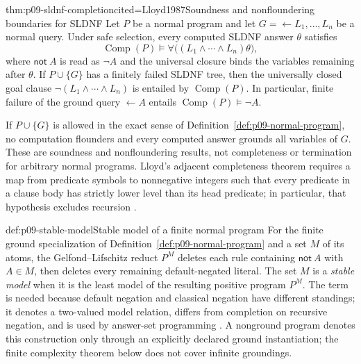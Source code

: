 \begin{hbtheorem}{thm:p09-sldnf-completion}{cited=Lloyd1987}{Soundness and nonfloundering boundaries for SLDNF}
Let \(P\) be a normal program and let
\(G=\leftarrow L_1,\ldots,L_n\) be a normal query.  Under safe selection, every
computed SLDNF answer \(\theta\) satisfies
\[
 \operatorname{Comp}(P)\models
 \forall\bigl((L_1\land\cdots\land L_n)\theta\bigr),
\]
where \(\mathsf{not}\ A\) is read as \(\neg A\) and the universal closure binds
the variables remaining after \(\theta\).  If \(P\cup\{G\}\) has a finitely
failed SLDNF tree, then the universally closed goal clause
\(\neg(L_1\land\cdots\land L_n)\) is entailed by
\(\operatorname{Comp}(P)\).  In particular, finite failure of the ground query
\(\leftarrow A\) entails \(\operatorname{Comp}(P)\models\neg A\).

If \(P\cup\{G\}\) is allowed in the exact sense of
Definition~\ref{def:p09-normal-program}, no computation flounders and every
computed answer grounds all variables of \(G\).  These are soundness and
nonfloundering results, not completeness or termination for arbitrary normal
programs.  Lloyd's adjacent completeness theorem requires a map from predicate
symbols to nonnegative integers such that every predicate in a clause body has
strictly lower level than its head predicate; in particular, that hypothesis
excludes recursion \cite[\S\S14--16, thms.~15.4, 15.6, and 16.3]{Lloyd1987}.
\end{hbtheorem}

\begin{hbdefinition}{def:p09-stable-model}{Stable model of a finite normal program}
For the finite ground specialization of
Definition~\ref{def:p09-normal-program} and a set \(M\) of its atoms, the
Gelfond--Lifschitz reduct \(P^M\) deletes each rule containing
\(\mathsf{not}\ A\) with \(A\in M\), then deletes every remaining
default-negated literal.  The set \(M\) is a \emph{stable model} when it is the
least model of the resulting positive program \(P^M\).  The term is needed
because default negation and classical negation have different standings; it
 denotes a two-valued model relation, differs from completion on recursive
 negation, and is used by answer-set programming
 \cite{GelfondLifschitz1988,Lifschitz2008TwelveDefinitions}.  A nonground
 program denotes this construction
 only through an explicitly declared ground instantiation; the finite
 complexity theorem below does not cover infinite groundings.
\end{hbdefinition}

